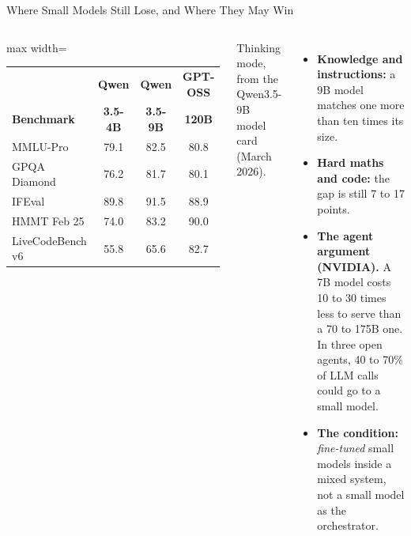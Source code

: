\begin{frame}{Where Small Models Still Lose, and Where They May Win}
    \begin{columns}[T,onlytextwidth]
        \centering
        \footnotesize
        \renewcommand{\arraystretch}{1.15}
        \setlength{\tabcolsep}{3pt}\begin{adjustbox}{max width=\linewidth}\begin{tabular}{lccc}
            \toprule
            & \textbf{Qwen} & \textbf{Qwen} & \textbf{GPT-OSS} \\
            \textbf{Benchmark} & \textbf{3.5-4B} & \textbf{3.5-9B} & \textbf{120B} \\
            \midrule
            MMLU-Pro & 79.1 & 82.5 & 80.8 \\
            GPQA Diamond & 76.2 & 81.7 & 80.1 \\
            IFEval & 89.8 & 91.5 & 88.9 \\
            HMMT Feb 25 & 74.0 & 83.2 & 90.0 \\
            \rowcolor{KAred!10} LiveCodeBench v6 & 55.8 & 65.6 & 82.7 \\
            \bottomrule
        \end{tabular}\end{adjustbox}

        \vspace{0.4em}
        {\scriptsize Thinking mode, from the Qwen3.5-9B model card (March 2026).}
        \begin{itemize}\itemsep0.45em
            \item \textbf{Knowledge and instructions:} a 9B model matches one more than ten times its size.
            \item \textbf{Hard maths and code:} the gap is still 7 to 17 points.
            \item \textbf{The agent argument (NVIDIA).} A 7B model costs 10 to 30 times less to serve than a 70 to 175B one. In three open agents, 40 to 70\% of LLM calls could go to a small model.
            \item \textbf{The condition:} \emph{fine-tuned} small models inside a mixed system, not a small model as the orchestrator.
        \end{itemize}
    \end{columns}
    \vspace{0.2em}
\end{frame}

